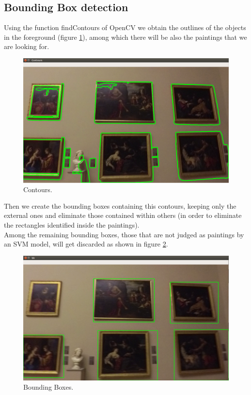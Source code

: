\documentclass[conference]{IEEEtran}
\begin{document}
\bigskip

\subsection{Bounding Box detection}
Using the function findContours of OpenCV we obtain the outlines of the objects in the foreground (figure \ref{fig:3_contours}), among which there will be also the paintings that we are looking for.\\
\bigskip

\begin{figure}[htbp]
  \centering
  \includegraphics[width=0.8\columnwidth]{../detection_pipeline/3_contours.png}
  \caption{Contours.}
  \label{fig:3_contours}
\end{figure}

\bigskip
Then we create the bounding boxes containing this contours, keeping only the external ones and eliminate those contained within others (in order to eliminate the rectangles identified inside the paintings).\\
Among the remaining bounding boxes, those that are not judged as paintings by an SVM model, will get discarded as shown in figure \ref{fig:4_bb}.

\bigskip

\begin{figure}[htbp]
  \centering
  \includegraphics[width=0.8\columnwidth]{../detection_pipeline/4_bb.png}
  \caption{Bounding Boxes.}
  \label{fig:4_bb}
\end{figure}
\end{document}
